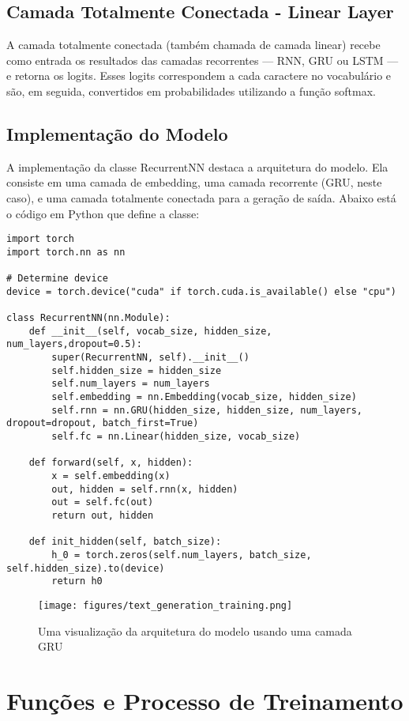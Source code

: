 \documentclass[a4paper,12pt]{article}
\begin{document}
\subsection{Camada Totalmente Conectada - Linear Layer}
A camada totalmente conectada (também chamada de camada linear) recebe como entrada os resultados das camadas recorrentes — RNN, GRU ou LSTM — e retorna os logits. Esses logits correspondem a cada caractere no vocabulário e são, em seguida, convertidos em probabilidades utilizando a função softmax.

\subsection{Implementação do Modelo}

A implementação da classe RecurrentNN destaca a arquitetura do modelo. Ela consiste em uma camada de embedding, uma camada recorrente (GRU, neste caso), e uma camada totalmente conectada para a geração de saída. Abaixo está o código em Python que define a classe:
\begin{verbatim}
import torch
import torch.nn as nn

# Determine device
device = torch.device("cuda" if torch.cuda.is_available() else "cpu")

class RecurrentNN(nn.Module):
    def __init__(self, vocab_size, hidden_size, num_layers,dropout=0.5):
        super(RecurrentNN, self).__init__()
        self.hidden_size = hidden_size
        self.num_layers = num_layers
        self.embedding = nn.Embedding(vocab_size, hidden_size)
        self.rnn = nn.GRU(hidden_size, hidden_size, num_layers, dropout=dropout, batch_first=True)
        self.fc = nn.Linear(hidden_size, vocab_size)

    def forward(self, x, hidden):
        x = self.embedding(x)
        out, hidden = self.rnn(x, hidden)
        out = self.fc(out)
        return out, hidden

    def init_hidden(self, batch_size):
        h_0 = torch.zeros(self.num_layers, batch_size, self.hidden_size).to(device)
        return h0
\end{verbatim}
      
\begin{figure}[h!]
   \centering
   \caption{Uma visualização da arquitetura do modelo usando uma camada GRU}
   \texttt{[image: figures/text\_generation\_training.png]}
\end{figure}

\section{Funções e Processo de Treinamento}
\end{document}
